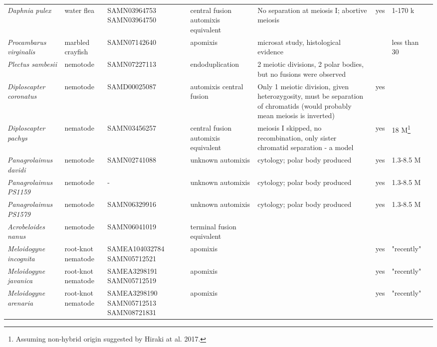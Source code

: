 \documentclass{article}
\begin{document}
\begin{longtable}[H]{ C{.13\textwidth} C{.1\textwidth} C{.12\textwidth} L{.15\textwidth} L{.179\textwidth} C{.04\textwidth} C{.082\textwidth} C{.062\textwidth}}
      \textit{Daphnia pulex} & water flea & SAMN03964753 SAMN03964750 & central fusion automixis equivalent & No separation at meiosis I; abortive meiosis & yes & 1-170 k & \cite{Hiruta2010} \\
      \textit{Procambarus virginalis} & marbled crayfish & SAMN07142640 & apomixis & microsat study, histological evidence &  & less than 30 & \cite{Vogt2004,Martin2015,Vogt2015} \\
      \hline
      \textit{Plectus sambesii} & nemotode & SAMN07227113 & endoduplication & 2 meiotic divisions, 2 polar bodies, but no fusions were observed &  & & \cite{Lahl2006} \\
      \textit{Diploscapter coronatus} & nemotode & SAMD00025087 & automixis central fusion & Only 1 meiotic division, given heterozygosity, must be separation of chromatids (would probably mean meiosis is inverted) & yes & & \cite{Lahl2006,Hiraki2017} \\
      \textit{Diploscapter pachys} & nematode & SAMN03456257 & central fusion automixis equivalent & meiosis I skipped, no recombination, only sister chromatid separation - a model & yes & 18 M\footnote{Assuming non-hybrid origin suggested by Hiraki at al. 2017.} & \cite{Fradin2017} \\
      \textit{Panagrolaimus davidi} & nemotode & SAMN02741088 & unknown automixis & cytology; polar body produced & yes & 1.3-8.5 M & \cite{Schiffer2017} \\
      \textit{Panagrolaimus PS1159} & nemotode & - & unknown automixis & cytology; polar body produced & yes & 1.3-8.5 M & \cite{Schiffer2017} \\
      \textit{Panagrolaimus PS1579} & nemotode & SAMN06329916 & unknown automixis & cytology; polar body produced & yes & 1.3-8.5 M & \cite{Schiffer2017} \\
      \textit{Acrobeloides nanus} & nemotode & SAMN06041019 & terminal fusion equivalent & & & & \cite{Lahl2006} \\
      \textit{Meloidogyne incognita} & root-knot nematode & SAMEA104032784 SAMN05712521 & apomixis & & yes & "recently" & \cite{Triantaphyllou1981, VanderBeek1998, Lunt2014} \\
      \textit{Meloidogyne javanica} & root-knot nematode & SAMEA3298191 SAMN05712519 & apomixis & & yes & "recently" & \cite{Lunt2014} \\
      \textit{Meloidogyne arenaria} & root-knot nematode & SAMEA3298190 SAMN05712513 SAMN08721831 & apomixis & & yes & "recently" & \cite{Lunt2014} \\

\end{longtable}
\end{document}
